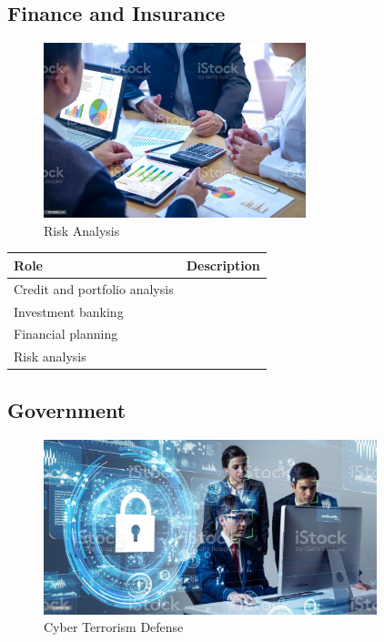 \subsection{Finance and Insurance}

\begin{figure}[H]
	\begin{center}
		\caption{Risk Analysis}
		\vskip 4pt
		\includegraphics[height=2in]{images/careers/istockphoto-1210565724-1024x1024.jpg}
	\end{center}
\end{figure}

\begin{table}[H]
	\begin{center}
		\begin{tabular}{p{1.3in}|p{3in}} 
			\textbf{Role} & \textbf{Description}\\
			\hline
			Credit and portfolio analysis & \\
			\hline
			Investment banking & \\
			\hline
			Financial planning & \\
			\hline
			Risk analysis & \\
			\hline
		\end{tabular}
	\end{center}
\end{table}

\subsection{Government}

\begin{figure}[H]
	\begin{center}
		\caption{Cyber Terrorism Defense}
		\vskip 4pt
		\includegraphics[height=2in]{images/careers/istockphoto-1169668290-1024x1024.jpg}
	\end{center}
\end{figure}


